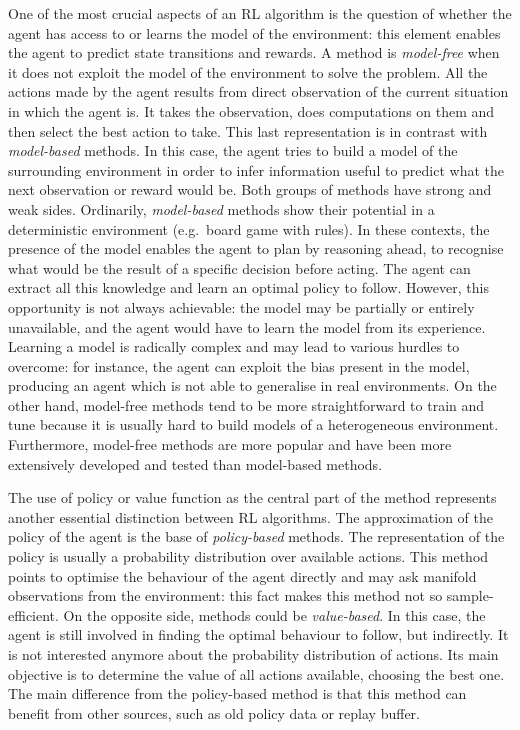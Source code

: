 One of the most crucial aspects of an RL algorithm is the question of whether the agent has access to or learns the model of the environment: this element enables the agent to predict state transitions and rewards.
A method is \textit{model-free} when it does not exploit the model of the environment to solve the problem.
All the actions made by the agent results from direct observation of the current situation in which the agent is.
It takes the observation, does computations on them and then select the best action to take.
This last representation is in contrast with \textit{model-based} methods.
In this case, the agent tries to build a model of the surrounding environment in order to infer information useful to predict what the next observation or reward would be.
Both groups of methods have strong and weak sides.
Ordinarily, \textit{model-based} methods show their potential in a deterministic environment (e.g.\ board game with rules).
In these contexts, the presence of the model enables the agent to plan by reasoning ahead, to recognise what would be the result of a specific decision before acting.
The agent can extract all this knowledge and learn an optimal policy to follow.
However, this opportunity is not always achievable: the model may be partially or entirely unavailable, and the agent would have to learn the model from its experience.
Learning a model is radically complex and may lead to various hurdles to overcome: for instance, the agent can exploit the bias present in the model, producing an agent which is not able to generalise in real environments.
On the other hand, model-free methods tend to be more straightforward to train and tune because it is usually hard to build models of a heterogeneous environment.
Furthermore, model-free methods are more popular and have been more extensively developed and tested than model-based methods.

The use of policy or value function as the central part of the method represents another essential distinction between RL algorithms.
The approximation of the policy of the agent is the base of \textit{policy-based} methods.
The representation of the policy is usually a probability distribution over available actions.
This method points to optimise the behaviour of the agent directly and may ask manifold observations from the environment: this fact makes this method not so sample-efficient.
On the opposite side, methods could be \textit{value-based}.
In this case, the agent is still involved in finding the optimal behaviour to follow, but indirectly.
It is not interested anymore about the probability distribution of actions.
Its main objective is to determine the value of all actions available, choosing the best one.
The main difference from the policy-based method is that this method can benefit from other sources, such as old policy data or replay buffer.

